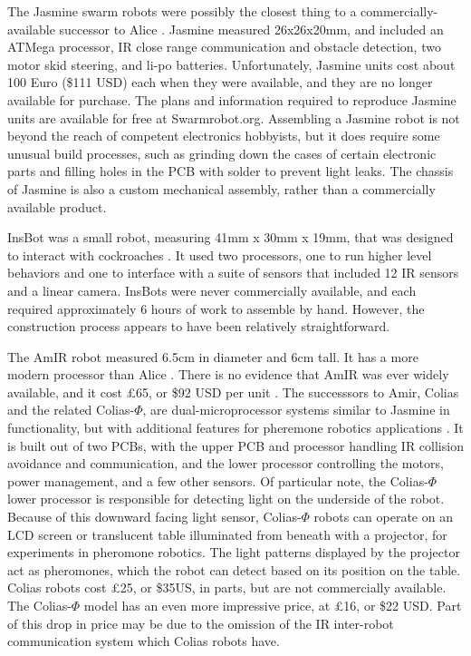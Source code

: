 The Jasmine swarm robots were possibly the closest thing to a commercially-available successor to Alice  \citep{kernbach2011swarmrobot}.
Jasmine measured 26x26x20mm, and included an ATMega processor, IR close range communication and obstacle detection, two motor skid steering, and li-po batteries.
Unfortunately, Jasmine units cost about 100 Euro (\$111 USD) each when they were available, and they are no longer available for purchase. 
The plans and information required to reproduce Jasmine units are available for free at Swarmrobot.org.
Assembling a Jasmine robot is not beyond the reach of competent electronics hobbyists, but it does require some unusual build processes, such as grinding down the cases of certain electronic parts and filling holes in the PCB with solder to prevent light leaks. 
The chassis of Jasmine is also a custom mechanical assembly, rather than a commercially available product. 

InsBot was a small robot, measuring 41mm x 30mm x 19mm, that was designed to interact with cockroaches \citep{colot2004insbot}.
It used two processors, one to run higher level behaviors and one to interface with a suite of sensors that included 12 IR sensors and a linear camera. 
InsBots were never commercially available, and each required approximately 6 hours of work to assemble by hand. 
However, the construction process appears to have been relatively straightforward. 

The AmIR robot measured 6.5cm in diameter and 6cm tall. It has a more modern processor than Alice \citep{arvin2009development}.
There is no evidence that AmIR was ever widely available, and it cost \pounds65, or \$92 USD per unit \citep{arvin2015colias}.
The successsors to Amir, Colias and the related Colias-$\Phi$, are dual-microprocessor systems similar to Jasmine in functionality, but with additional features for pheremone robotics applications \citep{arvin2014colias, arvin2015colias}. 
It is built out of two PCBs, with the upper PCB and processor handling IR collision avoidance and communication, and the lower processor controlling the motors, power management, and a few other sensors.
Of particular note, the Colias-$\Phi$ lower processor is responsible for detecting light on the underside of the robot. 
Because of this downward facing light sensor, Colias-$\Phi$ robots can operate on an LCD screen or translucent table illuminated from beneath with a projector, for experiments in pheromone robotics. 
The light patterns displayed by the projector act as pheromones, which the robot can detect based on its position on the table. 
Colias robots cost \pounds25, or \$35US, in parts, but are not commercially available. 
The Colias-$\Phi$ model has an even more impressive price, at \pounds16, or \$22 USD.
Part of this drop in price may be due to the omission of the IR inter-robot communication system which Colias robots have. 


